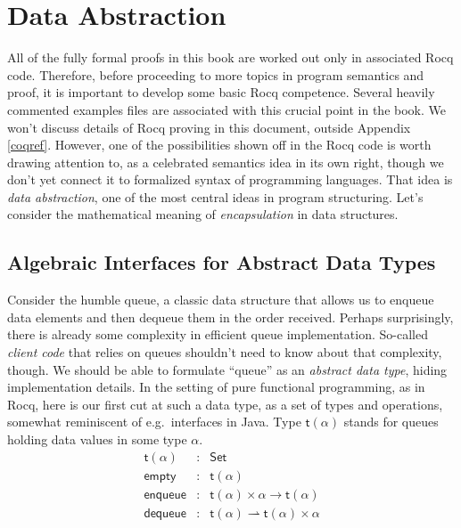 \documentclass{amsbook}
\theoremstyle{definition}
\theoremstyle{remark}
\numberwithin{section}{chapter}
\numberwithin{equation}{chapter}
\begin{document}

\chapter{Data Abstraction}\label{adt}

All of the fully formal proofs in this book are worked out only in associated Rocq code.
Therefore, before proceeding to more topics in program semantics and proof, it is important to develop some basic Rocq competence.
Several heavily commented examples files are associated with this crucial point in the book.
We won't discuss details of Rocq proving in this document, outside Appendix \ref{coqref}.
However, one of the possibilities shown off in the Rocq code is worth drawing attention to, as a celebrated semantics idea in its own right, though we don't yet connect it to formalized syntax of programming languages.
That idea is \emph{data abstraction}, one of the most central ideas in program structuring.
Let's consider the mathematical meaning of \emph{encapsulation} in data structures.

\section{Algebraic Interfaces for Abstract Data Types}

\newcommand{\mt}[1]{\mathsf{#1}}

Consider the humble queue, a classic data structure that allows us to enqueue data elements and then dequeue them in the order received.
Perhaps surprisingly, there is already some complexity in efficient queue implementation.
So-called \emph{client code} that relies on queues shouldn't need to know about that complexity, though.
We should be able to formulate ``queue'' as an \emph{abstract data type}, hiding implementation details.
In the setting of pure functional programming, as in Rocq, here is our first cut at such a data type, as a set of types and operations, somewhat reminiscent of e.g.\ interfaces in Java.
Type $\mt{t}(\alpha)$ stands for queues holding data values in some type $\alpha$.
\begin{eqnarray*}
  \mt{t}(\alpha) &:& \mt{Set} \\
  \mt{empty} &:& \mt{t}(\alpha) \\
  \mt{enqueue} &:& \mt{t}(\alpha) \times \alpha \to \mt{t}(\alpha) \\
  \mt{dequeue} &:& \mt{t}(\alpha) \rightharpoonup \mt{t}(\alpha) \times \alpha
\end{eqnarray*}
\end{document}
